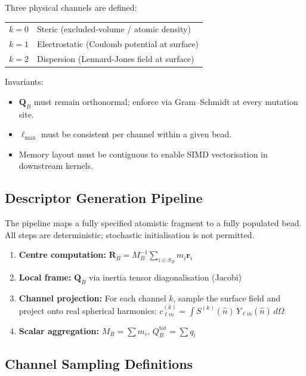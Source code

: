 \documentclass[11pt]{article}
\begin{document}
Three physical channels are defined:
\begin{center}
\begin{tabular}{cl}
    $k=0$ & Steric (excluded-volume / atomic density) \\
    $k=1$ & Electrostatic (Coulomb potential at surface) \\
    $k=2$ & Dispersion (Lennard-Jones field at surface) \\
\end{tabular}
\end{center}

\noindent
Invariants:
\begin{itemize}
    \item $\mathbf{Q}_B$ must remain orthonormal; enforce via Gram--Schmidt at every mutation site.
    \item $\ell_{\max}$ must be consistent per channel within a given bead.
    \item Memory layout must be contiguous to enable SIMD vectorisation in downstream kernels.
\end{itemize}

\subsection{Descriptor Generation Pipeline}

The pipeline maps a fully specified atomistic fragment to a fully populated
bead.  All steps are deterministic; stochastic initialisation is not permitted.

\begin{enumerate}
    \item \textbf{Centre computation:} $\mathbf{R}_B = M_B^{-1} \sum_{i \in S_B} m_i \mathbf{r}_i$
    \item \textbf{Local frame:} $\mathbf{Q}_B$ via inertia tensor diagonalisation (Jacobi)
    \item \textbf{Channel projection:} For each channel $k$, sample the surface field and project onto real spherical harmonics: $c_{\ell m}^{(k)} = \int S^{(k)}(\hat{n})\, Y_{\ell m}(\hat{n})\, d\Omega$
    \item \textbf{Scalar aggregation:} $M_B = \sum m_i$, \; $Q_B^{\mathrm{tot}} = \sum q_i$
\end{enumerate}

\subsection{Channel Sampling Definitions}
\end{document}
